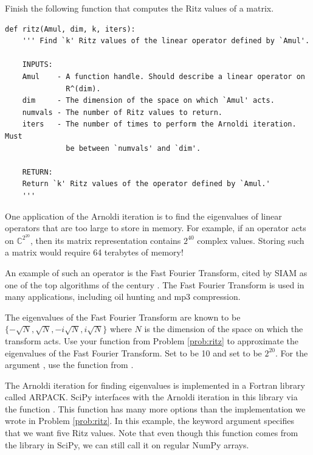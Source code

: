 \begin{problem}\label{prob:ritz}
Finish the following function that computes the Ritz values of a matrix.
\begin{lstlisting}
def ritz(Amul, dim, k, iters):
    ''' Find `k' Ritz values of the linear operator defined by `Amul'.
    
    INPUTS:
    Amul    - A function handle. Should describe a linear operator on 
              R^(dim).
    dim     - The dimension of the space on which `Amul' acts.
    numvals - The number of Ritz values to return.
    iters   - The number of times to perform the Arnoldi iteration. Must 
              be between `numvals' and `dim'.
    
    RETURN:
    Return `k' Ritz values of the operator defined by `Amul.' 
    '''
\end{lstlisting}
\end{problem}

One application of the Arnoldi iteration is to find the eigenvalues of linear operators that are too large to store in memory.
For example, if an operator acts on $\mathbb{C}^{2^{20}}$, then its matrix representation contains $2^{40}$ complex values.
Storing such a matrix would require 64 terabytes of memory!

An example of such an operator is the Fast Fourier Transform, cited by SIAM as one of the top algorithms of the century \cite{Cipra2000}.
The Fast Fourier Transform is used in many applications, including oil hunting and mp3 compression.


\begin{problem}
\label{prob:fourier_eigs}
The eigenvalues of the Fast Fourier Transform are known to be $\{ -\sqrt{N}, \sqrt{N}, -i\sqrt{N}, i\sqrt{N} \}$ where $N$ is the dimension of the space on which the transform acts.
Use your function  from Problem \ref{prob:ritz} to approximate the eigenvalues of the Fast Fourier Transform.
Set  to be 10 and set  to be $2^{20}$.
For the argument , use the  function from .
\end{problem}

The Arnoldi iteration for finding eigenvalues is implemented in a Fortran library called ARPACK. 
SciPy interfaces with the Arnoldi iteration in this library via the function .
This function has many more options than the implementation we wrote in Problem \ref{prob:ritz}.
In this example, the keyword argument  specifies that we want five Ritz values.
Note that even though this function comes from the  library in SciPy, we can still call it on regular NumPy arrays.

